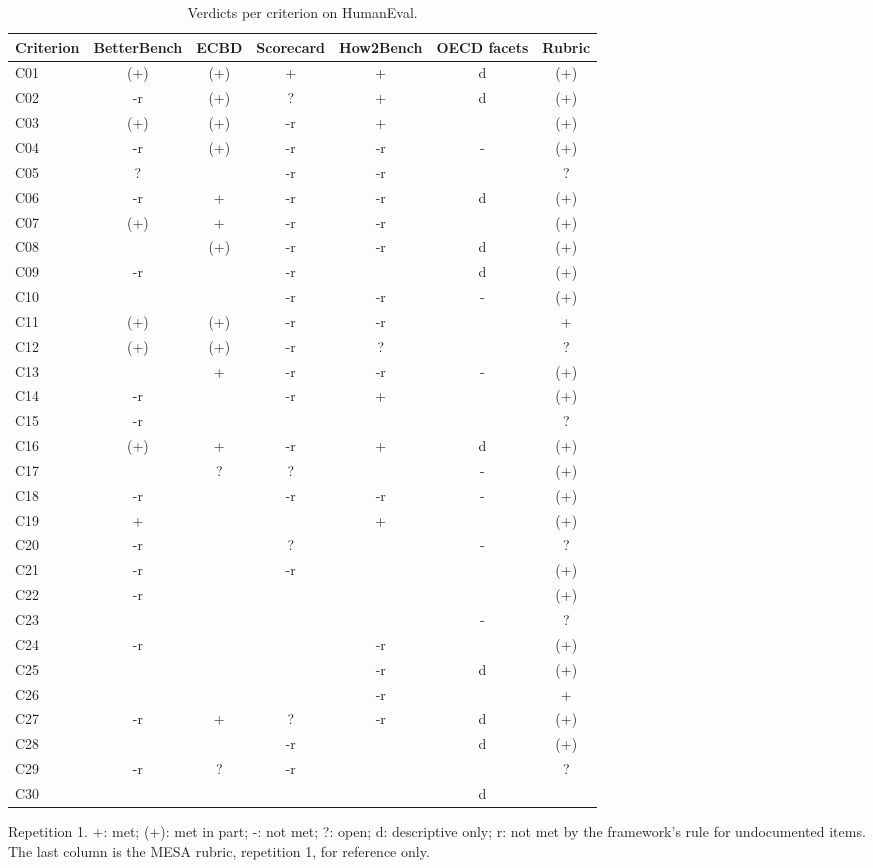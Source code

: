 \documentclass[10pt,conference]{IEEEtran}
\begin{document}
\begin{table}[t]
\caption{Verdicts per criterion on HumanEval.}
\label{tab:grid-humaneval}
\centering
\small\begin{tabular}{lcccccc}\toprule
\textbf{Criterion} & \textbf{BetterBench} & \textbf{ECBD} & \textbf{Scorecard} & \textbf{How2Bench} & \textbf{OECD facets} & \textbf{Rubric} \\
\midrule
C01 & (+) & (+) & + & + & d & (+) \\
C02 & -r & (+) & ? & + & d & (+) \\
C03 & (+) & (+) & -r & + &  & (+) \\
C04 & -r & (+) & -r & -r & - & (+) \\
C05 & ? &  & -r & -r &  & ? \\
C06 & -r & + & -r & -r & d & (+) \\
C07 & (+) & + & -r & -r &  & (+) \\
C08 &  & (+) & -r & -r & d & (+) \\
C09 & -r &  & -r &  & d & (+) \\
C10 &  &  & -r & -r & - & (+) \\
C11 & (+) & (+) & -r & -r &  & + \\
C12 & (+) & (+) & -r & ? &  & ? \\
C13 &  & + & -r & -r & - & (+) \\
C14 & -r &  & -r & + &  & (+) \\
C15 & -r &  &  &  &  & ? \\
C16 & (+) & + & -r & + & d & (+) \\
C17 &  & ? & ? &  & - & (+) \\
C18 & -r &  & -r & -r & - & (+) \\
C19 & + &  &  & + &  & (+) \\
C20 & -r &  & ? &  & - & ? \\
C21 & -r &  & -r &  &  & (+) \\
C22 & -r &  &  &  &  & (+) \\
C23 &  &  &  &  & - & ? \\
C24 & -r &  &  & -r &  & (+) \\
C25 &  &  &  & -r & d & (+) \\
C26 &  &  &  & -r &  & + \\
C27 & -r & + & ? & -r & d & (+) \\
C28 &  &  & -r &  & d & (+) \\
C29 & -r & ? & -r &  &  & ? \\
C30 &  &  &  &  & d &  \\
\bottomrule\end{tabular}
\par\vspace{2pt}\raggedright\footnotesize Repetition 1. +: met; (+): met in part; -: not met; ?: open; d: descriptive only; r: not met by the framework's rule for undocumented items. The last column is the MESA rubric, repetition 1, for reference only.
\end{table}
\end{document}
